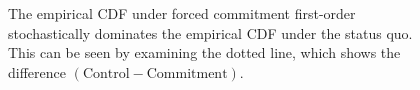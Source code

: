 \begin{figure}[!h]
    The empirical CDF under forced commitment first-order stochastically dominates the empirical CDF under the status quo. This can be seen by examining the dotted line, which shows the difference $(\text{Control} - \text{Commitment})$. 
\end{figure}
   


